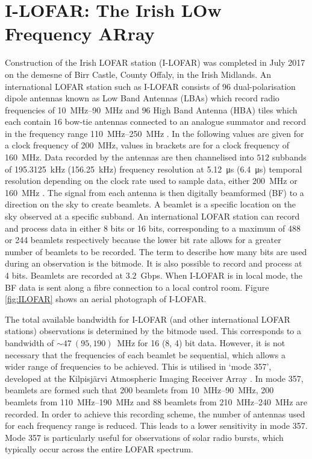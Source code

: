 \section{I-LOFAR: The Irish LOw Frequency ARray}
\label{sec:I-LOFAR}
Construction of the Irish LOFAR station (I-LOFAR) was completed in July 2017 on the demesne of Birr Castle, County Offaly, in the Irish Midlands. An international LOFAR station such as I-LOFAR consists of $96$ dual-polarisation dipole antennas known as Low Band Antennas (LBAs) which record radio frequencies of \SIrange{10}{90}{\mega\hertz} and $96$ High Band Antenna (HBA) tiles which each contain $16$ bow-tie antennas connected to an analogue summator and record in the frequency range \SIrange{110}{250}{\mega\hertz} \citep[see][ for a full description of LOFAR antennas]{VanHaarlem2013}. In the following values are given for a clock frequency of 200~MHz, values in brackets are for a clock frequency of 160~MHz. Data recorded by the antennas are then channelised into $512$ subbands of \SI{195.3125}{\kilo\hertz} (\SI{156.25}{\kilo\hertz}) frequency resolution at \SI{5.12}{\micro\second} (\SI{6.4}{\micro\second}) temporal resolution depending on the clock rate used to sample data, either \SI{200}{\mega \hertz} or \SI{160}{\mega \hertz} \citep{VanHaarlem2013}. The signal from each antenna is then digitally beamformed (BF) to a direction on the sky to create beamlets. A beamlet is a specific location on the sky observed at a specific subband. An international LOFAR station can record and process data in either 8 bits or 16 bits, corresponding to a maximum of 488 or 244 beamlets respectively because the lower bit rate allows for a greater number of beamlets to be recorded. The term to describe how many bits are used during an observation is the bitmode. It is also possible to record and process at 4 bits. Beamlets are recorded at $3.2$~Gbps. When I-LOFAR is in local mode, the BF data is sent along a fibre connection to a local control room. Figure \ref{fig:ILOFAR} shows an aerial photograph of I-LOFAR. 

The total available bandwidth for I-LOFAR (and other international LOFAR stations) observations is determined by the bitmode used. This corresponds to a bandwidth of $\sim 47 \ (95, 190)$~MHz for 16 (8, 4) bit data. However, it is not necessary that the frequencies of each beamlet be sequential, which allows  a wider range of frequencies to be achieved. 
This is utilised in `mode 357', developed at the Kilpisjärvi Atmospheric Imaging Receiver Array \citep[KAIRA;][]{McKay-Bukowski2015}. In mode 357, beamlets are formed such that 200 beamlets from \SIrange{10}{90}{\mega\hertz}, 200 beamlets from \SIrange{110}{190}{\mega\hertz} and 88 beamlets from \SIrange{210}{240}{\mega\hertz} are recorded. In order to achieve this recording scheme, the number of antennas used for each frequency range is reduced. This leads to a lower sensitivity in mode 357. Mode 357 is particularly useful for observations of solar radio bursts, which typically occur across the entire LOFAR spectrum.

